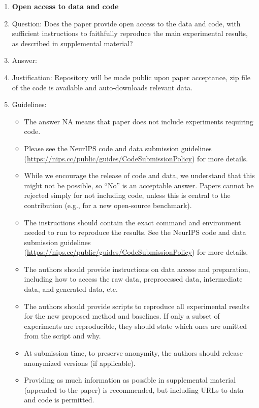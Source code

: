 \documentclass{article}
\theoremstyle{plain}
\theoremstyle{definition}
\theoremstyle{remark}
\begin{document}
\begin{enumerate}
\item {\bf Open access to data and code}
    \item[] Question: Does the paper provide open access to the data and code, with sufficient instructions to faithfully reproduce the main experimental results, as described in supplemental material?
    \item[] Answer: \answerYes{} %
    \item[] Justification: Repository will be made public upon paper acceptance, zip file of the code is available and auto-downloads relevant data.
    \item[] Guidelines:
    \begin{itemize}
        \item The answer NA means that paper does not include experiments requiring code.
        \item Please see the NeurIPS code and data submission guidelines (\url{https://nips.cc/public/guides/CodeSubmissionPolicy}) for more details.
        \item While we encourage the release of code and data, we understand that this might not be possible, so “No” is an acceptable answer. Papers cannot be rejected simply for not including code, unless this is central to the contribution (e.g., for a new open-source benchmark).
        \item The instructions should contain the exact command and environment needed to run to reproduce the results. See the NeurIPS code and data submission guidelines (\url{https://nips.cc/public/guides/CodeSubmissionPolicy}) for more details.
        \item The authors should provide instructions on data access and preparation, including how to access the raw data, preprocessed data, intermediate data, and generated data, etc.
        \item The authors should provide scripts to reproduce all experimental results for the new proposed method and baselines. If only a subset of experiments are reproducible, they should state which ones are omitted from the script and why.
        \item At submission time, to preserve anonymity, the authors should release anonymized versions (if applicable).
        \item Providing as much information as possible in supplemental material (appended to the paper) is recommended, but including URLs to data and code is permitted.
    \end{itemize}



\end{enumerate}
\end{document}

